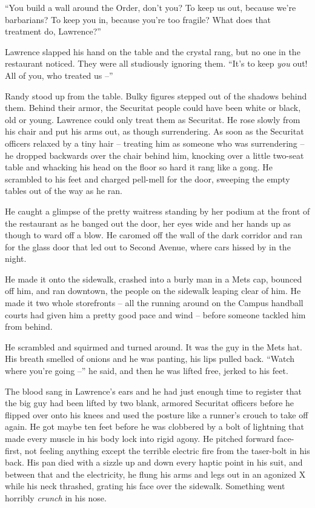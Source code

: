 “You build a wall around the Order, don't you? To keep us out, 
because we're barbarians? To keep you in, because you're too fragile? 
What does that treatment do, Lawrence?”

Lawrence slapped his hand on the table and the crystal rang, but no one 
in the restaurant noticed. They were all studiously ignoring them. 
“It's to keep \emph{you} out! All of you, who treated us --”

Randy stood up from the table. Bulky figures stepped out of the shadows 
behind them. Behind their armor, the Securitat people could have been 
white or black, old or young. Lawrence could only treat them as 
Securitat. He rose slowly from his chair and put his arms out, as 
though surrendering. As soon as the Securitat officers relaxed by a 
tiny hair -- treating him as someone who was surrendering -- he dropped 
backwards over the chair behind him, knocking over a little two-seat 
table and whacking his head on the floor so hard it rang like a gong. 
He scrambled to his feet and charged pell-mell for the door, sweeping 
the empty tables out of the way as he ran.

He caught a glimpse of the pretty waitress standing by her podium at 
the front of the restaurant as he banged out the door, her eyes wide 
and her hands up as though to ward off a blow. He caromed off the wall 
of the dark corridor and ran for the glass door that led out to Second 
Avenue, where cars hissed by in the night.

He made it onto the sidewalk, crashed into a burly man in a Mets cap, 
bounced off him, and ran downtown, the people on the sidewalk leaping 
clear of him. He made it two whole storefronts -- all the running 
around on the Campus handball courts had given him a pretty good pace 
and wind -- before someone tackled him from behind.

He scrambled and squirmed and turned around. It was the guy in the Mets 
hat. His breath smelled of onions and he was panting, his lips pulled 
back. “Watch where you're going --” he said, and then he was lifted 
free, jerked to his feet.

The blood sang in Lawrence's ears and he had just enough time to 
register that the big guy had been lifted by two blank, armored 
Securitat officers before he flipped over onto his knees and used the 
posture like a runner's crouch to take off again. He got maybe ten feet 
before he was clobbered by a bolt of lightning that made every muscle 
in his body lock into rigid agony. He pitched forward face-first, not 
feeling anything except the terrible electric fire from the taser-bolt 
in his back. His pan died with a sizzle up and down every haptic point 
in his suit, and between that and the electricity, he flung his arms 
and legs out in an agonized X while his neck thrashed, grating his face 
over the sidewalk. Something went horribly \emph{crunch} in his nose.


